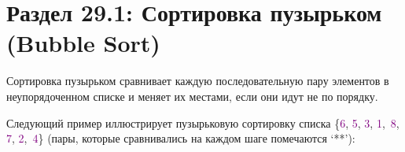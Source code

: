 \section*{Раздел 29.1: Сортировка пузырьком (Bubble Sort)}

Сортировка пузырьком сравнивает каждую последовательную пару элементов в неупорядоченном списке и меняет их местами, если они идут не по порядку.

\vspace{\baselineskip}

Следующий пример иллюстрирует пузырьковую сортировку списка \{\textcolor{Purple}{6}, \textcolor{Purple}{5}, \textcolor{Purple}{3}, \textcolor{Purple}{1},\ \textcolor{Purple}{8}, \textcolor{Purple}{7}, \textcolor{Purple}{2},\ \textcolor{Purple}{4}\} (пары, которые сравнивались на каждом шаге помечаются ‘**’):

\vspace{\baselineskip}

